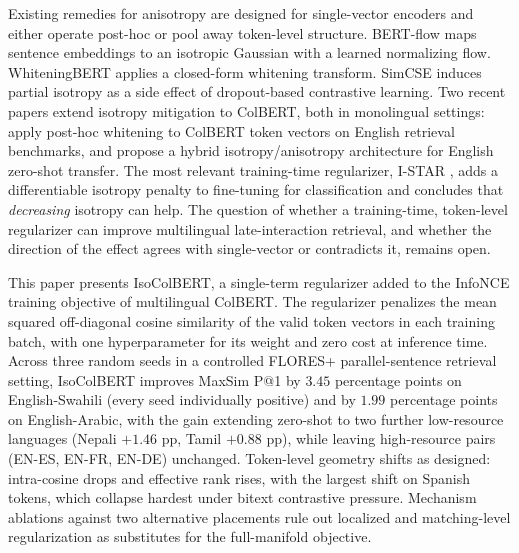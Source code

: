 Existing remedies for anisotropy are designed for single-vector encoders and either operate post-hoc or pool away token-level structure. BERT-flow \citep{li2020sentenceembeddings} maps sentence embeddings to an isotropic Gaussian with a learned normalizing flow. WhiteningBERT \citep{huang2021whiteningbert} applies a closed-form whitening transform. SimCSE \citep{gao2021simcse} induces partial isotropy as a side effect of dropout-based contrastive learning. Two recent papers extend isotropy mitigation to ColBERT, both in monolingual settings: \citet{jung2023isotropic} apply post-hoc whitening to ColBERT token vectors on English retrieval benchmarks, and \citet{kim2024hil} propose a hybrid isotropy/anisotropy architecture for English zero-shot transfer. The most relevant training-time regularizer, I-STAR \citep{rudman2024istar}, adds a differentiable isotropy penalty to fine-tuning for classification and concludes that \emph{decreasing} isotropy can help. The question of whether a training-time, token-level regularizer can improve multilingual late-interaction retrieval, and whether the direction of the effect agrees with single-vector or contradicts it, remains open.

This paper presents IsoColBERT, a single-term regularizer added to the InfoNCE training objective of multilingual ColBERT. The regularizer penalizes the mean squared off-diagonal cosine similarity of the valid token vectors in each training batch, with one hyperparameter for its weight and zero cost at inference time. Across three random seeds in a controlled FLORES+ parallel-sentence retrieval setting, IsoColBERT improves MaxSim P@1 by $3.45$ percentage points on English-Swahili (every seed individually positive) and by $1.99$ percentage points on English-Arabic, with the gain extending zero-shot to two further low-resource languages (Nepali $+1.46$ pp, Tamil $+0.88$ pp), while leaving high-resource pairs (EN-ES, EN-FR, EN-DE) unchanged. Token-level geometry shifts as designed: intra-cosine drops and effective rank rises, with the largest shift on Spanish tokens, which collapse hardest under bitext contrastive pressure. Mechanism ablations against two alternative placements rule out localized and matching-level regularization as substitutes for the full-manifold objective.

